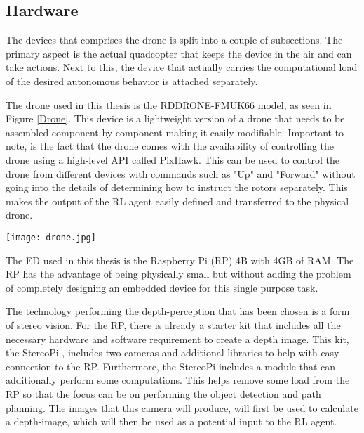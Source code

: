 \subsection{Hardware}
The devices that comprises the drone is split 
into a couple of subsections. The primary aspect is the actual quadcopter that keeps 
the device in the air and can take actions. Next to this, the device that actually 
carries the computational load of the desired autonomous behavior is attached separately. 

The drone used in this thesis is the RDDRONE-FMUK66 model, as seen in Figure \ref{Drone}.
This device is a lightweight version of a drone that needs to be assembled component 
by component making it easily modifiable. Important 
to note, is the fact that the drone comes with the availability of controlling the 
drone using a high-level API called PixHawk. This can be used to control the drone 
from different devices with commands such as "Up" and "Forward" without going into 
the details of determining how to instruct the rotors separately. This makes 
the output of the RL agent easily defined and transferred to the physical
drone.

\begin{Figure}
    \centering
    \texttt{[image: drone.jpg]}
    \label{Drone}
\end{Figure}

The ED used in this thesis is the Raspberry Pi (RP) 4B 
with 4GB of RAM. The RP has the advantage of being physically small but without adding 
the problem of completely designing an embedded device for this single purpose task. 

The technology performing the depth-perception that has been chosen is a form of 
stereo vision. For the RP, there is already a starter kit that includes 
all the necessary hardware and software requirement to create a depth image. This 
kit, the StereoPi \cite{StereoPi}, includes two cameras and additional libraries to 
help with easy connection to the RP. Furthermore, the StereoPi includes a module that 
can additionally perform some computations. This helps remove some load from the 
RP so that the focus can be on performing the object detection and path planning.
The images that this camera will produce, will first be used to calculate a depth-image,
which will then be used as a potential input to the RL agent. 
